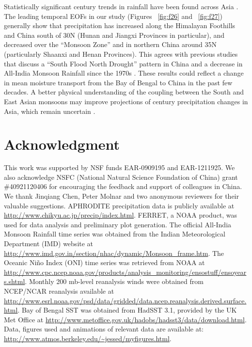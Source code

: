 	Statistically significant  century trends in rainfall have been found across Asia \citep{Christensen2011,Singh2014}. The leading temporal EOFs in our study (Figures ~\ref{fig:f26} and ~\ref{fig:f27}) generally show that precipitation has increased along the Himalayan Foothills and China south of 30\textdegree N (Hunan and Jiangxi Provinces in particular), and decreased over the ``Monsoon Zone'' and in northern China around 35\textdegree N (particularly Shaanxi and Henan Provinces). This agrees with previous studies that discuss a ``South Flood North Drought'' pattern in China \citep{Ding2008} and a decrease in All-India Monsoon Rainfall since the 1970s \citep{Annamalai2013}. These results could reflect a change in mean moisture transport from the Bay of Bengal to China in the past few decades. A better physical understanding of the coupling between the South and East Asian monsoons may improve projections of  century precipitation changes in Asia, which remain uncertain \citep{Christensen2011}.	 
	 
\section{Acknowledgment} 

	This work was supported by NSF funds EAR-0909195 and EAR-1211925. We also acknowledge NSFC (National Natural Science Foundation of China) grant \#40921120406 for encouraging the feedback and support of colleagues in China. We thank Jinqiang Chen, Peter Molnar and two anonymous reviewers for their valuable suggestions. APHRODITE precipitation data is publicly available at \url{http://www.chikyu.ac.jp/precip/index.html}. FERRET, a NOAA product, was used for data analysis and preliminary plot generation. The official All-India Monsoon Rainfall time series was obtained from the Indian Meteorological Department (IMD) website at \url{http://www.imd.gov.in/section/nhac/dynamic/Monsoon_frame.htm}. The Oceanic Ni\~no Index (ONI) time series was retrieved from NOAA at \url{http://www.cpc.ncep.noaa.gov/products/analysis_monitoring/ensostuff/ensoyears.shtml}. Monthly 200 mb-level reanalysis winds were obtained from NCEP/NCAR reanalysis available at \url{http://www.esrl.noaa.gov/psd/data/gridded/data.ncep.reanalysis.derived.surface.html}. Bay of Bengal SST was obtained from HadSST 3.1, provided by the UK Met Office at \url{http://www.metoffice.gov.uk/hadobs/hadsst3/data/download.html}. Data, figures used and animations of relevant data are available at: \url{http://www.atmos.berkeley.edu/~jessed/myfigures.html}.
	
